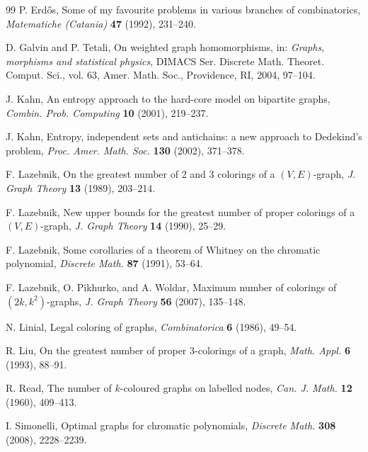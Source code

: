 \documentclass[11pt]{article}
\begin{document}
\begin{thebibliography}{99}
 P. Erd\H{o}s, Some of my favourite problems in
  various branches of combinatorics, \emph{Matematiche (Catania)}
  \textbf{47} (1992), 231--240.

 D. Galvin and P. Tetali, On weighted graph
  homomorphisms, in: \emph{Graphs, morphisms and statistical physics},
  DIMACS Ser. Discrete Math. Theoret. Comput. Sci., vol. 63,
  Amer. Math. Soc., Providence, RI, 2004, 97--104.

 J. Kahn, An entropy approach to the hard-core
  model on bipartite graphs, \emph{Combin. Prob. Computing}
  \textbf{10} (2001), 219--237.

 J. Kahn, Entropy, independent sets and
  antichains: a new approach to Dedekind's problem,
  \emph{Proc. Amer. Math. Soc.} \textbf{130} (2002), 371--378.

 F. Lazebnik, On the greatest number of 2 and 3
  colorings of a $(V,E)$-graph, \emph{J. Graph Theory} \textbf{13}
  (1989), 203--214.

 F. Lazebnik, New upper bounds for the
  greatest number of proper colorings of a $(V,E)$-graph,
  \emph{J. Graph Theory} \textbf{14} (1990), 25--29.

 F. Lazebnik, Some corollaries of a theorem
  of Whitney on the chromatic polynomial, \emph{Discrete Math.}
  \textbf{87} (1991), 53--64.

 F. Lazebnik, O. Pikhurko, and A. Woldar, Maximum number
  of colorings of $(2k, k^2)$-graphs, \emph{J. Graph Theory}
  \textbf{56} (2007), 135--148.

 N. Linial, Legal coloring of graphs,
  \emph{Combinatorica} \textbf{6} (1986), 49--54.

 R. Liu, On the greatest number of proper 3-colorings of
  a graph, \emph{Math. Appl.} \textbf{6} (1993), 88--91.


 R. Read, The number of $k$-coloured graphs on labelled
  nodes, \emph{Can. J. Math.} \textbf{12} (1960), 409--413.

 I. Simonelli, Optimal graphs for chromatic
  polynomials, \emph{Discrete Math.} \textbf{308} (2008), 2228--2239.


\end{thebibliography}
\end{document}
